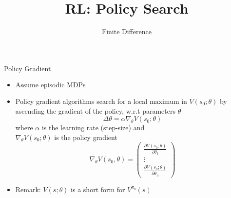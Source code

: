 \documentclass[aspectratio=169]{../latex_main/tntbeamer}  %
\title[RL: Finite Difference]{RL: Policy Search}
\subtitle{Finite Difference}
\begin{document}
	
	\maketitle

\begin{frame}[c]{Policy Gradient}

\begin{itemize}
	\item Assume episodic MDPs 
	\item Policy gradient algorithms search for a \alert{local} maximum in $V(s_0;\theta)$ by ascending the gradient of the policy, w.r.t parameters $\theta$
	$$\Delta \theta = \alpha \nabla_\theta V(s_0; \theta) $$
	where $\alpha$ is the learning rate (step-size) and\\ $\nabla_\theta V(s_0; \theta)$ is the policy gradient
		$$\nabla_\theta V(s_0, \theta) = \begin{pmatrix}
	\frac{\partial V(s_0; \theta)}{\partial \theta_1}\\
	\vdots\\
	\frac{\partial V(s_0; \theta)}{\partial \theta_n}
	\end{pmatrix} $$
	\medskip
	\item Remark: $V(s;\theta)$ is a short form for $V^{\pi_{\theta}}(s)$ 
\end{itemize}

\end{frame}
\end{document}
